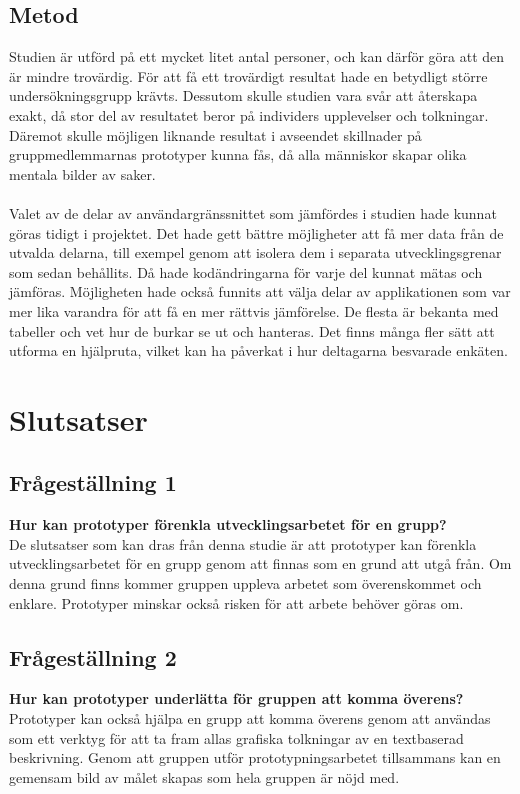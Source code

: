 \subsection{Metod}
\label{sec:rebecca-discussion-method}
Studien är utförd på ett mycket litet antal personer, och kan därför göra att den är mindre trovärdig. För att få ett trovärdigt resultat hade en betydligt större undersökningsgrupp krävts. Dessutom skulle studien vara svår att återskapa exakt, då stor del av resultatet beror på individers upplevelser och tolkningar. Däremot skulle möjligen liknande resultat i avseendet skillnader på gruppmedlemmarnas prototyper kunna fås, då alla människor skapar olika mentala bilder av saker. 
\\ \\
Valet av de delar av användargränssnittet som jämfördes i studien hade kunnat göras tidigt i projektet.
Det hade gett bättre möjligheter att få mer data från de utvalda delarna, till exempel genom att isolera dem i separata utvecklingsgrenar som sedan behållits. 
Då hade kodändringarna för varje del kunnat mätas och jämföras.
Möjligheten hade också funnits att välja delar av applikationen som var mer lika varandra för att få en mer rättvis jämförelse. 
De flesta är bekanta med tabeller och vet hur de burkar se ut och hanteras. Det finns många fler sätt att utforma en hjälpruta, vilket kan ha påverkat i hur deltagarna besvarade enkäten.

\section{Slutsatser}
\label{cha:rebecca-conclusion}

\subsection{Frågeställning 1}
\textbf{Hur kan prototyper förenkla utvecklingsarbetet för en grupp?}
\\
De slutsatser som kan dras från denna studie är att prototyper kan förenkla utvecklingsarbetet för en grupp genom att finnas som en grund att utgå från. Om denna grund finns kommer gruppen uppleva arbetet som överenskommet och enklare. Prototyper minskar också risken för att arbete behöver göras om. 
\subsection{Frågeställning 2}
\textbf{Hur kan prototyper underlätta för gruppen att komma överens?}
\\
Prototyper kan också hjälpa en grupp att komma överens genom att användas som ett verktyg för att ta fram allas grafiska tolkningar av en textbaserad beskrivning. Genom att gruppen utför prototypningsarbetet tillsammans kan en gemensam bild av målet skapas som hela gruppen är nöjd med.
